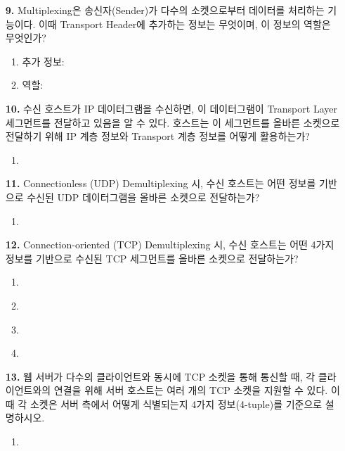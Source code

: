 \documentclass[a4paper, 10pt]{article}
\newcommand{\ansline}[1]{\underline{\hspace{#1}}}
\begin{document}
\begin{enumerate}[itemsep=2em, leftmargin=2em, label={}]
\item[\textbf{9.}] Multiplexing은 송신자(Sender)가 다수의 소켓으로부터 데이터를 처리하는 기능이다. 이때 Transport Header에 추가하는 정보는 무엇이며, 이 정보의 역할은 무엇인가?
\begin{enumerate}[label=\alph*., itemsep=0.3em, leftmargin=1.5em]
    \item 추가 정보: \ansline{5cm}
    \item 역할: \ansline{8cm}
\end{enumerate}

\item[\textbf{10.}] 수신 호스트가 IP 데이터그램을 수신하면, 이 데이터그램이 Transport Layer 세그먼트를 전달하고 있음을 알 수 있다. 호스트는 이 세그먼트를 올바른 소켓으로 전달하기 위해 IP 계층 정보와 Transport 계층 정보를 어떻게 활용하는가?
\begin{enumerate}[label={}, itemsep=0.3em, leftmargin=1.5em]
    \item \ansline{12cm}
\end{enumerate}

\item[\textbf{11.}] Connectionless (UDP) Demultiplexing 시, 수신 호스트는 어떤 정보를 기반으로 수신된 UDP 데이터그램을 올바른 소켓으로 전달하는가?
\begin{enumerate}[label=\alph*., itemsep=0.3em, leftmargin=1.5em]
    \item \ansline{7cm}
\end{enumerate}

\item[\textbf{12.}] Connection-oriented (TCP) Demultiplexing 시, 수신 호스트는 어떤 4가지 정보를 기반으로 수신된 TCP 세그먼트를 올바른 소켓으로 전달하는가?
\begin{enumerate}[label=\alph*., itemsep=0.3em, leftmargin=1.5em]
    \item \ansline{4cm}
    \item \ansline{4cm}
    \item \ansline{4cm}
    \item \ansline{4cm}
\end{enumerate}

\item[\textbf{13.}] 웹 서버가 다수의 클라이언트와 동시에 TCP 소켓을 통해 통신할 때, 각 클라이언트와의 연결을 위해 서버 호스트는 여러 개의 TCP 소켓을 지원할 수 있다. 이때 각 소켓은 서버 측에서 어떻게 식별되는지 4가지 정보(4-tuple)를 기준으로 설명하시오.
\begin{enumerate}[label={}, itemsep=0.3em, leftmargin=1.5em]
    \item \ansline{12cm}
\end{enumerate}



\end{enumerate}
\end{document}
